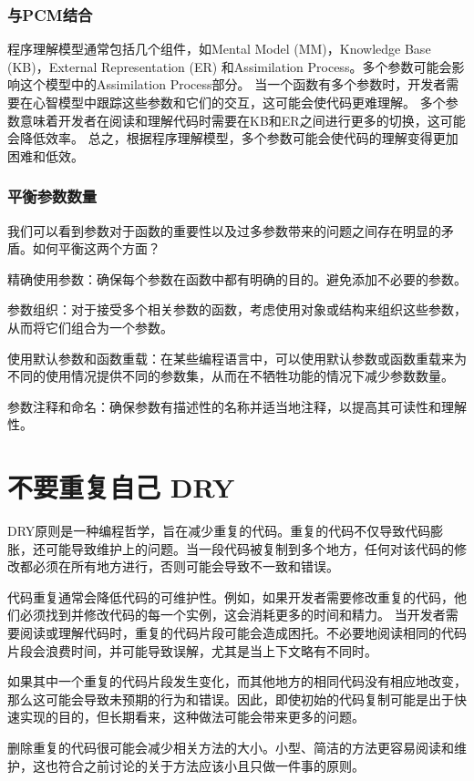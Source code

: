 \documentclass[]{ctexbook}
\begin{document}
\subsubsection{与PCM结合}
程序理解模型通常包括几个组件，如Mental Model (MM)，Knowledge Base (KB)，External Representation (ER) 和Assimilation Process。多个参数可能会影响这个模型中的Assimilation Process部分。
当一个函数有多个参数时，开发者需要在心智模型中跟踪这些参数和它们的交互，这可能会使代码更难理解。
多个参数意味着开发者在阅读和理解代码时需要在KB和ER之间进行更多的切换，这可能会降低效率。
总之，根据程序理解模型，多个参数可能会使代码的理解变得更加困难和低效。

\subsubsection{平衡参数数量}
我们可以看到参数对于函数的重要性以及过多参数带来的问题之间存在明显的矛盾。如何平衡这两个方面？

精确使用参数：确保每个参数在函数中都有明确的目的。避免添加不必要的参数。

参数组织：对于接受多个相关参数的函数，考虑使用对象或结构来组织这些参数，从而将它们组合为一个参数。

使用默认参数和函数重载：在某些编程语言中，可以使用默认参数或函数重载来为不同的使用情况提供不同的参数集，从而在不牺牲功能的情况下减少参数数量。

参数注释和命名：确保参数有描述性的名称并适当地注释，以提高其可读性和理解性。

\section{不要重复自己 DRY}
DRY原则是一种编程哲学，旨在减少重复的代码。重复的代码不仅导致代码膨胀，还可能导致维护上的问题。当一段代码被复制到多个地方，任何对该代码的修改都必须在所有地方进行，否则可能会导致不一致和错误。

代码重复通常会降低代码的可维护性。例如，如果开发者需要修改重复的代码，他们必须找到并修改代码的每一个实例，这会消耗更多的时间和精力。
当开发者需要阅读或理解代码时，重复的代码片段可能会造成困托。不必要地阅读相同的代码片段会浪费时间，并可能导致误解，尤其是当上下文略有不同时。

如果其中一个重复的代码片段发生变化，而其他地方的相同代码没有相应地改变，那么这可能会导致未预期的行为和错误。因此，即使初始的代码复制可能是出于快速实现的目的，但长期看来，这种做法可能会带来更多的问题。

删除重复的代码很可能会减少相关方法的大小。小型、简洁的方法更容易阅读和维护，这也符合之前讨论的关于方法应该小且只做一件事的原则。
\end{document}
